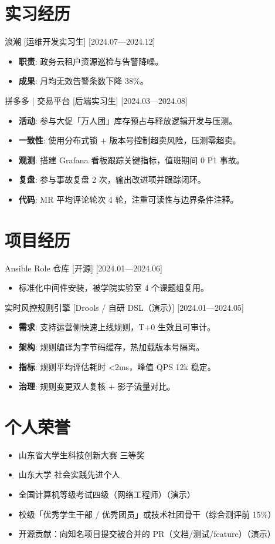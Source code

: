 \documentclass{resume-photo}
\begin{document}
\section{实习经历}
\ResumeItem
{浪潮}
[\textnormal{运维开发实习生}]
[2024.07—2024.12]

\begin{itemize}
  \item \textbf{职责}: 政务云租户资源巡检与告警降噪。
  \item \textbf{成果}: 月均无效告警条数下降 38\%。
\end{itemize}


\ResumeItem
{拼多多 | 交易平台}
[\textnormal{后端实习生}]
[2024.03—2024.08]

\begin{itemize}
  \item \textbf{活动}: 参与大促「万人团」库存预占与释放逻辑开发与压测。
  \item \textbf{一致性}: 使用分布式锁 + 版本号控制超卖风险，压测零超卖。
  \item \textbf{观测}: 搭建 Grafana 看板跟踪关键指标，值班期间 0 P1 事故。
  \item \textbf{复盘}: 参与事故复盘 2 次，输出改进项并跟踪闭环。
  \item \textbf{代码}: MR 平均评论轮次 4 轮，注重可读性与边界条件注释。
\end{itemize}



\section{项目经历}
\ResumeItem
{Ansible Role 仓库}
[\textnormal{开源}]
[2024.01—2024.06]

\begin{itemize}
  \item 标准化中间件安装，被学院实验室 4 个课题组复用。
\end{itemize}


\ResumeItem
{实时风控规则引擎}
[\textnormal{Drools / 自研 DSL（演示）}]
[2024.01—2024.05]

\begin{itemize}
  \item \textbf{需求}: 支持运营侧快速上线规则，T+0 生效且可审计。
  \item \textbf{架构}: 规则编译为字节码缓存，热加载版本号隔离。
  \item \textbf{指标}: 规则平均评估耗时 <2ms，峰值 QPS 12k 稳定。
  \item \textbf{治理}: 规则变更双人复核 + 影子流量对比。
\end{itemize}



\section{个人荣誉}
\begin{itemize}
  \item 山东省大学生科技创新大赛 三等奖
  \item 山东大学 社会实践先进个人
  \item 全国计算机等级考试四级（网络工程师）（演示）
  \item 校级「优秀学生干部 / 优秀团员」或技术社团骨干（综合测评前 15\%）
  \item 开源贡献：向知名项目提交被合并的 PR（文档/测试/feature）（演示）
\end{itemize}
\end{document}
